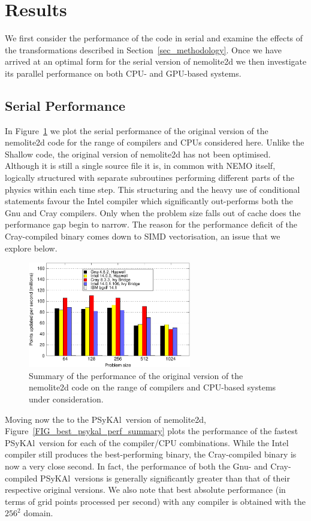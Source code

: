 \documentclass[journal]{IEEEtran}
\newcommand{\psykal}{{PS}y{KA}l\ }
\begin{document}
\section{Results}

We first consider the performance of the code in serial and examine
the effects of the transformations described in
Section~\ref{sec_methodology}. Once we have arrived at an optimal form
for the serial version of nemolite2d we then investigate its parallel
performance on both CPU- and GPU-based systems.

\subsection{Serial Performance}

In Figure~\ref{FIG_orig_perf_summary} we plot the serial performance
of the original version of the nemolite2d code for the range of
compilers and CPUs considered here. Unlike the Shallow code, the
original version of nemolite2d has not been optimised. Although it is
still a single source file it is, in common with NEMO itself,
logically structured with separate subroutines performing different
parts of the physics within each time step. This structuring and the
heavy use of conditional statements favour the Intel compiler which
significantly out-performs both the Gnu and Cray compilers. Only when
the problem size falls out of cache does the performance gap begin to
narrow. The reason for the performance deficit of the Cray-compiled
binary comes down to SIMD vectorisation, an issue that we explore
below.

\begin{figure}[!t]
\centering
\includegraphics[width=2.8in]{orig_summary}
\caption{Summary of the performance of the original version of the 
nemolite2d code on 
the range of compilers and CPU-based systems under consideration.}
\label{FIG_orig_perf_summary}
\end{figure}

Moving now the to the \psykal version of nemolite2d,
Figure~\ref{FIG_best_psykal_perf_summary} plots the performance of the
fastest \psykal version for each of the compiler/CPU combinations.
While the Intel compiler still produces the best-performing binary,
the Cray-compiled binary is now a very close second. In fact, the
performance of both the Gnu- and Cray-compiled \psykal versions is
generally significantly greater than that of their respective original
versions. We also note that best absolute performance (in terms of
grid points processed per second) with any compiler is obtained with
the $256^2$ domain.
\end{document}
